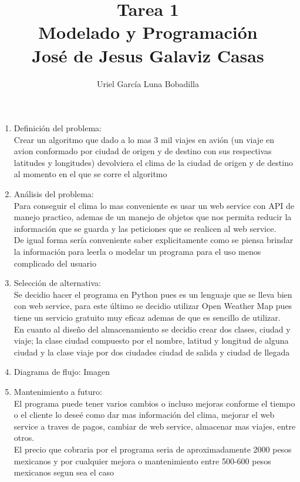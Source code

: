 \documentclass[12pt]{article}
\title{Tarea 1\\Modelado y Programaci\'on\\José de Jesus Galaviz Casas}
\author{Uriel Garc\'ia Luna Bobadilla}
\date{}
\begin{document}
    \maketitle
    \begin{enumerate}
        \item Definici\'on del problema:\\Crear un algoritmo que dado a lo mas 3 mil viajes en avi\'on (un viaje en avion conformado por ciudad de origen y de destino con sus respectivas latitudes y longitudes) devolviera el clima de la ciudad de origen y de destino al momento en el que se corre el algoritmo
        \item An\'alisis del problema:\\Para conseguir el clima lo mas conveniente es usar un web service con API de manejo practico, ademas de un manejo de objetos que nos permita reducir la informaci\'on que se guarda y las peticiones que se realicen al web service.\\De igual forma sería conveniente saber explicitamente como se piensa brindar la informaci\'on para leerla o modelar un programa para el uso menos complicado del usuario
        \item Selecci\'on de alternativa:\\Se decidio hacer el programa en Python pues es un lenguaje que se lleva bien con web service, para este \'ultimo se decidio utilizar Open Weather Map pues tiene un servicio gratuito muy  eficaz ademas de que es sencillo de utilizar.\\En cuanto al  diseño del almacenamiento se decidio crear dos clases, ciudad y viaje; la clase ciudad compuesto por el nombre, latitud y longitud de alguna ciudad y la clase viaje por dos ciudades ciudad de salida y ciudad de llegada 
        \item Diagrama de flujo: Imagen
        \item Mantenimiento a futuro:\\El programa puede tener varios cambios o incluso mejoras conforme el tiempo o el cliente lo dese\'e como dar mas información del clima, mejorar el web service a traves de pagos, cambiar de web service, almacenar mas viajes, entre otros.\\El precio que cobraria por el programa seria de aproximadamente 2000 pesos mexicanos y por cualquier mejora o mantenimiento entre 500-600 pesos mexicanos segun sea el caso
    \end{enumerate}
\end{document}
